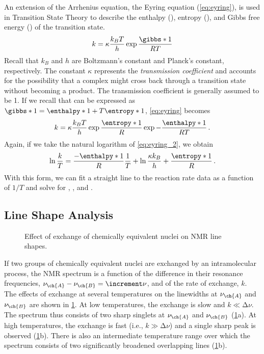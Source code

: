 An extension of the Arrhenius equation, the Eyring equation (\cref{eq:eyring}), is used in Transition State Theory to describe the enthalpy (), entropy (), and Gibbs free energy () of the transition state. 
\begin{equation}
  k = \kappa \frac{k_B T}{h} \exp{\frac{\gibbs*{1}}{RT}}
  \label{eq:eyring}
\end{equation}
Recall that \( k_B \) and \( h \) are Boltzmann's constant and Planck's constant, respectively. 
The constant \( \kappa \) represents the \emph{transmission coefficient} and accounts for the possibility that a complex might cross back through a transition state without becoming a product. 
The transmission coefficient is generally assumed to be \num{1}. 
If we recall that  can be expressed as \( \gibbs*{1} = \enthalpy*{1} + T \entropy*{1} \), \cref{eq:eyring} becomes 
\begin{equation}
  k = \kappa \frac{k_B T}{h} \exp{\frac{\entropy*{1}}{R}} \exp{-\frac{\enthalpy*{1}}{R T}} \, .
  \label{eq:eyring_2}
\end{equation}
Again, if we take the natural logarithm of \cref{eq:eyring_2}, we obtain
\begin{equation}
  \ln{\frac{k}{T}} = \frac{-\enthalpy*{1}}{R} \frac{1}{T} 
    + \ln{\frac{\kappa k_B}{h}} + \frac{\entropy*{1}}{R} \, .
  \label{eq:eyring_linear}
\end{equation}
With this form, we can fit a straight line to the reaction rate data as a function of \( 1/T \) and solve for , , and . 


\subsection{Line Shape Analysis} %
\label{sub:line_shape_analysis}

\begin{figure}
	
	\caption{Effect of exchange of chemically equivalent nuclei on NMR line shapes.}
	\label{fig:lineshapes}
\end{figure}
If two groups of chemically equivalent nuclei are exchanged by an intramolecular process, the NMR spectrum is a function of the difference in their resonance frequencies, \( \nu_{\ch{A}} - \nu_{\ch{B}} = \increment\nu \), and of the rate of exchange, \( k \). 
The effects of exchange at several temperatures on the linewidths at \( \nu_{\ch{A}} \) and \( \nu_{\ch{B}} \) are shown in \cref{fig:lineshapes}. 
At low temperatures, the exchange is slow and \( k \ll \increment\nu \). 
The spectrum thus consists of two sharp singlets at \( \nu_{\ch{A}} \) and \( \nu_{\ch{B}} \) (\cref{fig:lineshapes}a). 
At high temperatures, the exchange is fast (i.e., \( k \gg \increment\nu \)) and a single sharp peak is observed (\cref{fig:lineshapes}b). 
There is also an intermediate temperature range over which the spectrum consists of two significantly broadened overlapping lines (\cref{fig:lineshapes}b).


